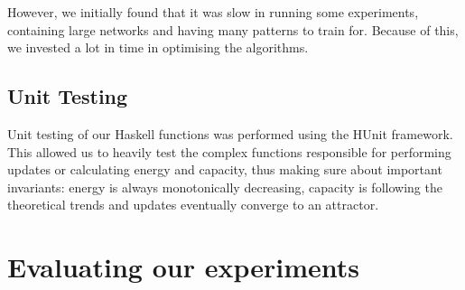 However, we initially found that it was slow in running some experiments, containing large networks and having many patterns to train for. Because of this, we invested a lot in time in optimising the algorithms. 

\subsection{Unit Testing}

Unit testing of our Haskell functions was performed using the HUnit framework. This allowed us to heavily test the complex functions responsible for performing updates or calculating energy and capacity, thus making sure about important invariants: energy is always monotonically decreasing, capacity is following the theoretical trends and updates eventually converge to an attractor. 


\section{Evaluating our experiments}

